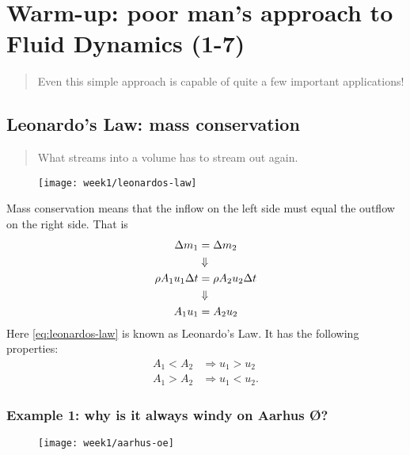 \section{Warm-up: poor man's approach to Fluid Dynamics (1-7)}
\begin{quote}
    Even this simple approach is capable of quite a few important applications!
\end{quote}

\subsection{Leonardo's Law: mass conservation}
\begin{quote}
    What streams into a volume has to stream out again.
\end{quote}

\begin{figure}[h!]
    \centering
    \texttt{[image: week1/leonardos-law]}
    \caption{}
    \label{fig:leonardos-law}
\end{figure}

Mass conservation means that the inflow on the left side must equal the outflow on the right side. That is
\begin{align}
    \Delta m_1 &= \Delta m_2\\
    &\Downarrow\notag\\
    \rho A_1 u_1 \Delta t &= \rho A_2 u_2 \Delta t\\
    &\Downarrow\notag\\
    A_1 u_1 &= A_2 u_2 \label{eq:leonardos-law}
\end{align}
Here \eqref{eq:leonardos-law} is known as Leonardo's Law. It has the following properties:
\begin{align}
    A_1 < A_ 2 &\Rightarrow u_1 > u_2\\
    A_1 > A_ 2 &\Rightarrow u_1 < u_2.
    \label{}
\end{align}

\subsubsection{Example 1: why is it always windy on Aarhus Ø?}
\begin{figure}[!h]
    \centering
    \texttt{[image: week1/aarhus-oe]}
    \caption{}
    \label{fig:aarhus-oe}
\end{figure}

